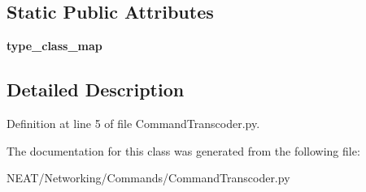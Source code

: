 \subsection*{Static Public Attributes}
\begin{DoxyCompactItemize}
\item 
{\bfseries type\+\_\+class\+\_\+map}\hypertarget{class_n_e_a_t___py_genetics_1_1_n_e_a_t_1_1_networking_1_1_commands_1_1_command_transcoder_1_1_command_transcoder_a161a64d3c2586008802d174ebc5b6e4b}{}\label{class_n_e_a_t___py_genetics_1_1_n_e_a_t_1_1_networking_1_1_commands_1_1_command_transcoder_1_1_command_transcoder_a161a64d3c2586008802d174ebc5b6e4b}

\end{DoxyCompactItemize}


\subsection{Detailed Description}


Definition at line 5 of file Command\+Transcoder.\+py.



The documentation for this class was generated from the following file\+:\begin{DoxyCompactItemize}
\item 
N\+E\+A\+T/\+Networking/\+Commands/Command\+Transcoder.\+py\end{DoxyCompactItemize}
